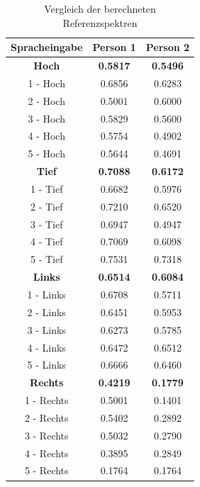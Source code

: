 \documentclass[12pt, oneside, a4paper, \docLanguage]{report}
\begin{document}
\begin{table}[H]
	\centering\small
	\begin{tabular}{||c | c | c||}
		 \hline
		 Spracheingabe & Person 1 & Person 2 \\ [0.5ex] 
		 \hline
		 \textbf{Hoch} & \textbf{0.5817} & \textbf{0.5496} \\ 
		 \hline
		 1 - Hoch & 0.6856 & 0.6283 \\ 
		 \hline
		 2 - Hoch & 0.5001 & 0.6000 \\ 
		 \hline
		 3 - Hoch & 0.5829 & 0.5600 \\ 
		 \hline
		 4 - Hoch & 0.5754 & 0.4902 \\ 
		 \hline
		 5 - Hoch & 0.5644 & 0.4691 \\ 
		 \hline
		 \textbf{Tief} & \textbf{0.7088} & \textbf{0.6172} \\
		 \hline
		 1 - Tief & 0.6682 & 0.5976 \\ 
		 \hline
		 2 - Tief & 0.7210 & 0.6520 \\ 
		 \hline
		 3 - Tief & 0.6947 &0.4947 \\ 
		 \hline
		 4 - Tief & 0.7069 &0.6098 \\ 
		 \hline
		 5 - Tief & 0.7531 & 0.7318 \\ 
		\hline
		\textbf{Links} & \textbf{0.6514} & \textbf{0.6084} \\
		\hline
		 1 - Links & 0.6708 & 0.5711 \\ 
		 \hline
		 2 - Links & 0.6451 & 0.5953 \\ 
		 \hline
		 3 - Links & 0.6273 & 0.5785 \\ 
		 \hline
		 4 - Links & 0.6472 & 0.6512 \\ 
		 \hline
		 5 - Links & 0.6666 &  0.6460 \\ 
		 \hline
		 \textbf{Rechts} & \textbf{0.4219} & \textbf{0.1779} \\
		 \hline
		 1 - Rechts & 0.5001 & 0.1401 \\ 
		 \hline
		 2 - Rechts & 0.5402 & 0.2892 \\ 
		 \hline
		 3 - Rechts & 0.5032 & 0.2790 \\ 
		 \hline
		 4 - Rechts & 0.3895 & 0.2849 \\ 
		 \hline
		 5 - Rechts & 0.1764 & 0.1764 \\ 
		 \hline
	\end{tabular}
	\caption{Vergleich der berechneten Referenzspektren}
	\label{fig:Vergleich der berechneten Referenzspektren}
\end{table}
\newpage
\end{document}
